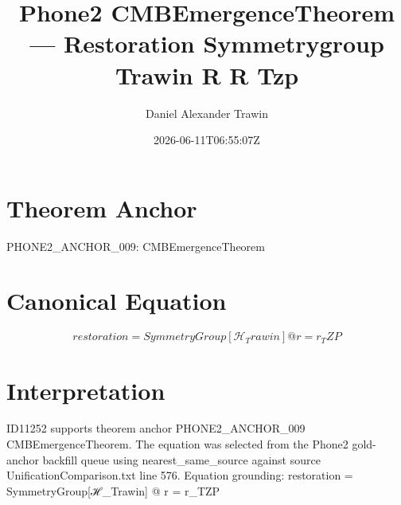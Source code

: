 \documentclass[11pt]{article}
\title{Phone2 CMBEmergenceTheorem — Restoration Symmetrygroup Trawin R R Tzp}
\author{Daniel Alexander Trawin}
\date{2026-06-11T06:55:07Z}
\begin{document}
\maketitle
\section*{Theorem Anchor}
PHONE2_ANCHOR_009: CMBEmergenceTheorem
\section*{Canonical Equation}
\[
restoration = SymmetryGroup[ℋ_Trawin] @ r = r_TZP
\]
\section*{Interpretation}
ID11252 supports theorem anchor PHONE2_ANCHOR_009 CMBEmergenceTheorem. The equation was selected from the Phone2 gold-anchor backfill queue using nearest_same_source against source UnificationComparison.txt line 576. Equation grounding: restoration = SymmetryGroup[ℋ_Trawin] @ r = r_TZP
\end{document}
